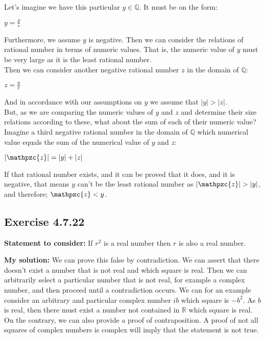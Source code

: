 \documentclass{article}
\newcommand{\cent}[1]{\begin{center}#1\end{center}}
\newcommand{\doubleR}{\mathbb{R}}
\newcommand{\doubleQ}{\mathbb{Q}}
\newcommand{\script}[1]{\mathpzc{#1}}
\newcommand{\Remark}{\textbf{Statement to consider: }}
\newcommand{\Solution}{\textbf{My solution: }}
\newcommand{\QED}{\boxed{}}
\newcommand{\Exercise}[1]{\subsection{Exercise #1}}
\begin{document}
	Let's imagine we have this particular $y \in \doubleQ$.  It must be on the form:
	
	\cent{$y = \frac{p}{r}$}
	
	Furthermore, we assume $y$ is negative. Then we can consider the relations of rational number in terms of numeric values. That is, the numeric value of $y$ must be very large as it is the least rational number. \\
	
	Then we can consider another negative rational number $z$ in the domain of $\doubleQ$:
	
	\cent{$z = \frac{q}{r}$}
	
	And in accordance with our assumptions on $y$ we assume that $|y| > |z|$.\\
	
	But, as we are comparing the numeric values of $y$ and $z$ and determine their size relations according to these, what about the sum of each of their numeric value?\\
	
	Imagine a third negative rational number in the domain of $\doubleQ$ which numerical value equals the sum of the numerical value of $y$ and $z$:
	
	\cent{$|\script{z}| = |y| + |z|$}
	
	If that rational number exists, and it can be proved that it does, and it is negative, that means $y$ can't be the least rational number as $|\script{z}| > |y|$, and therefore; $\script{z} < y$.\\
	\QED
	
	\Exercise{4.7.22}
	
	\Remark
	If $r^2$ is a real number then $r$ is also a real number.
	
	\Solution
	We can prove this false by contradiction. We can assert that there doesn't exist a number that is not real and which square is real. Then we can arbitrarily select a particular number that is not real, for example a complex number, and then proceed until a contradiction occurs. We can for an example consider an arbitrary and particular complex number $ib$ which square is $-b^2$. As $b$ is real, then there must exist a number not contained in $\doubleR$ which square is real.\\
	
	On the contrary, we can also provide a proof of contraposition. A proof of not all squares of complex numbers is complex will imply that the statement is not true.\\
	
\end{document}

